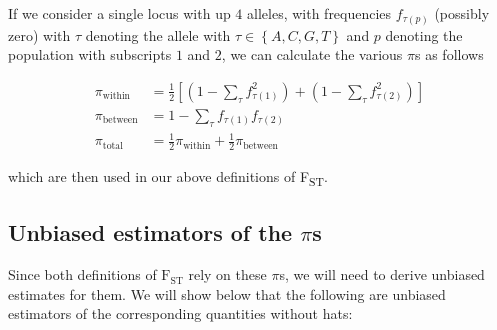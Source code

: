 \documentclass[a4paper,fontsize=9pt,DIV=14]{scrartcl}
\newcommand{\fst}{F\textsubscript{ST}}
\begin{document}
If we consider a single locus with up $4$ alleles, with frequencies $f_{\tau(p)}$ (possibly zero) with  $\tau$ denoting the allele with $\tau \in \left\{A, C, G, T\right\}$ and $p$ denoting the population with subscripts $1$ and $2$, we can calculate the various $\pi$s as follows

\begin{align}
    \label{eq:PiDefs:PiWithin}
    \pi_\text{within} &= \frac{1}{2}\left[\left(1 - \sum_\tau f_{\tau(1)}^2\right) + \left(1 - \sum_\tau f_{\tau(2)}^2\right)\right] \\
    \label{eq:PiDefs:PiBetween}
    \pi_\text{between} &= 1 - \sum_\tau f_{\tau(1)}f_{\tau(2)} \\
    \label{eq:PiDefs:PiTotal}
    \pi_\text{total} &= \frac{1}{2}\pi_\text{within} + \frac{1}{2}\pi_\text{between}
\end{align}

which are then used in our above definitions of \fst.


\subsection{Unbiased estimators of the \texorpdfstring{$\pi$s}{pi's}}
\label{supp:sec:FST:sub:EstimatorsPi}

Since both definitions of $\text{F}_\text{ST}$ rely on these $\pi$s, we will need to derive unbiased estimates for them.
We will show below that the following are unbiased estimators of the corresponding quantities without hats:
\end{document}
